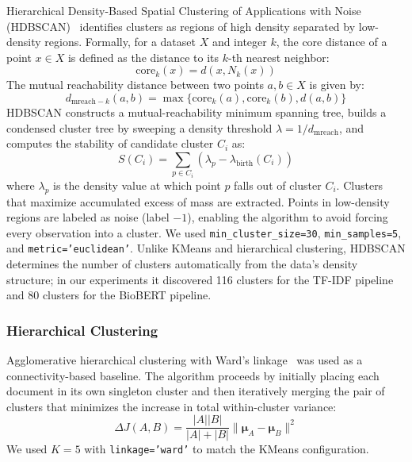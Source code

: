 \documentclass[a4paper,10pt,conference]{IEEEtran}
\begin{document}
Hierarchical Density-Based Spatial Clustering of Applications with Noise (HDBSCAN)~\cite{ref22} identifies clusters as regions of high density separated by low-density regions. Formally, for a dataset $X$ and integer $k$, the core distance of a point $x \in X$ is defined as the distance to its $k$-th nearest neighbor:
\begin{equation}
\text{core}_k(x) = d(x, N_k(x))
\end{equation}
The mutual reachability distance between two points $a, b \in X$ is given by:
\begin{equation}
d_{\text{mreach}-k}(a, b) = \max \{ \text{core}_k(a), \text{core}_k(b), d(a, b) \}
\end{equation}
HDBSCAN constructs a mutual-reachability minimum spanning tree, builds a condensed cluster tree by sweeping a density threshold $\lambda = 1 / d_{\text{mreach}}$, and computes the stability of candidate cluster $C_i$ as:
\begin{equation}
S(C_i) = \sum_{p \in C_i} (\lambda_p - \lambda_{\text{birth}}(C_i))
\end{equation}
where $\lambda_p$ is the density value at which point $p$ falls out of cluster $C_i$. Clusters that maximize accumulated excess of mass are extracted. Points in low-density regions are labeled as noise (label $-1$), enabling the algorithm to avoid forcing every observation into a cluster. We used \texttt{min\_cluster\_size=30}, \texttt{min\_samples=5}, and \texttt{metric='euclidean'}. Unlike KMeans and hierarchical clustering, HDBSCAN determines the number of clusters automatically from the data's density structure; in our experiments it discovered 116 clusters for the TF-IDF pipeline and 80 clusters for the BioBERT pipeline.

\subsubsection{Hierarchical Clustering}

Agglomerative hierarchical clustering with Ward's linkage~\cite{ref25} was used as a connectivity-based baseline. The algorithm proceeds by initially placing each document in its own singleton cluster and then iteratively merging the pair of clusters that minimizes the increase in total within-cluster variance:
\begin{equation}
\Delta J(A, B) = \frac{|A| |B|}{|A| + |B|} \| \boldsymbol{\mu}_A - \boldsymbol{\mu}_B \|^2
\end{equation}
We used $K=5$ with \texttt{linkage='ward'} to match the KMeans configuration.
\end{document}
